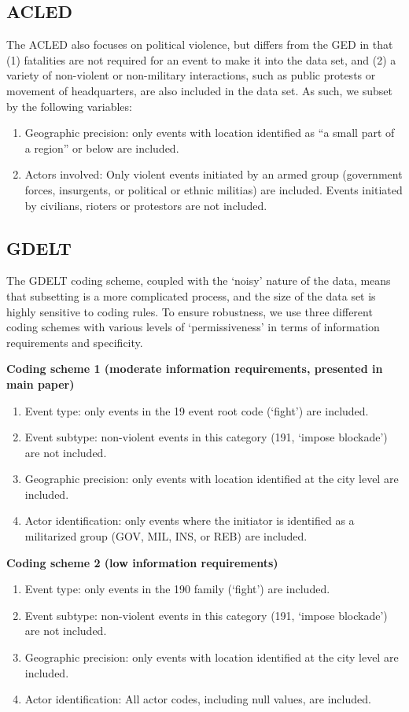 \documentclass[hidelinks]{article}
\begin{document}
\subsection*{ACLED}
The ACLED also focuses on political violence, but differs from the GED in that (1) fatalities are not required for an event to make it into the data set, and (2) a variety of non-violent or non-military interactions, such as public protests or movement of headquarters, are also included in the data set. As such, we subset by the following variables:
\begin{enumerate}
\item Geographic precision: only events with location identified as ``a small part of a region'' or below are included.
\item Actors involved: Only violent events initiated by an armed group (government forces, insurgents, or political or ethnic militias) are included. Events initiated by civilians, rioters or protestors are not included.
\end{enumerate}

\subsection*{GDELT}
The GDELT coding scheme, coupled with the `noisy' nature of the data, means that subsetting is a more complicated process, and the size of the data set is highly sensitive to coding rules. To ensure robustness, we use three different coding schemes with various levels of `permissiveness' in terms of information requirements and specificity.

\textbf{Coding scheme 1 (moderate information requirements, presented in main paper)}
\begin{enumerate}
\item Event type: only events in the 19 event root code (`fight') are included.
\item Event subtype: non-violent events in this category (191, `impose blockade') are not included.
\item Geographic precision: only events with location identified at the city level are included.
\item Actor identification: only events where the initiator is identified as a militarized group (GOV, MIL, INS, or REB) are included.
\end{enumerate}

\textbf{Coding scheme 2 (low information requirements)}
\begin{enumerate}
\item Event type: only events in the 190 family (`fight') are included.
\item Event subtype: non-violent events in this category (191, `impose blockade') are not included.
\item Geographic precision: only events with location identified at the city level are included.
\item Actor identification: All actor codes, including null values, are included.
\end{enumerate}
\end{document}
